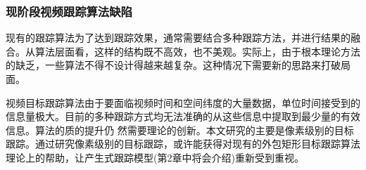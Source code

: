 \subsubsection{现阶段视频跟踪算法缺陷}
现有的跟踪算法为了达到跟踪效果，通常需要结合多种跟踪方法，并进行结果的融合。从算法层面看，这样的结构既不高效，也不美观。实际上，由于根本理论方法的缺乏，一些算法不得不设计得越来越复杂。这种情况下需要新的思路来打破局面。
\par
视频目标跟踪算法由于要面临视频时间和空间纬度的大量数据，单位时间接受到的信息量极大。目前的多种跟踪方式均无法准确的从这些信息中提取到最少量的有效信息。算法的质的提升仍 然需要理论的创新。本文研究的主要是像素级别的目标跟踪。通过研究像素级别的目标跟踪，或许能获得对现有的外包矩形目标跟踪算法理论上的帮助，让产生式跟踪模型(第2章中将会介绍)重新受到重视。

